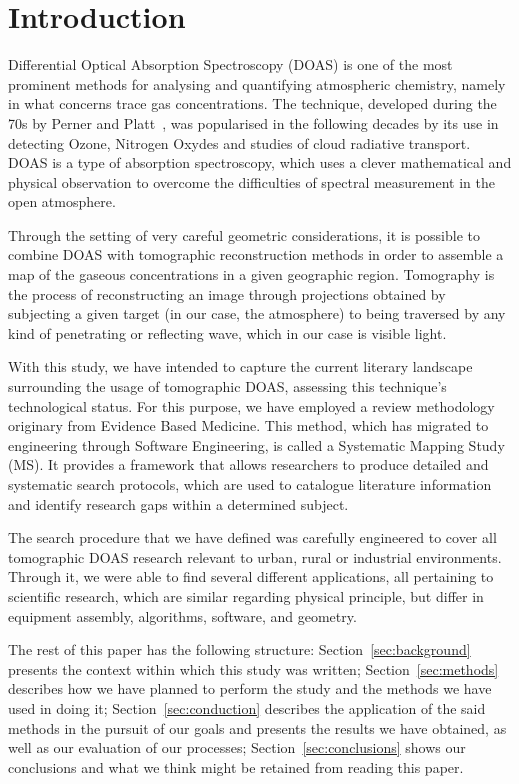 \section{Introduction}
\label{sec:introduction}

Differential Optical Absorption Spectroscopy (DOAS) is one of the most
prominent methods for analysing and quantifying atmospheric chemistry,
namely in what concerns trace gas concentrations. The technique,
developed during the 70s by Perner and Platt~\cite{Perner1976}, was
popularised in the following decades by its use in detecting Ozone,
Nitrogen Oxydes and studies of cloud radiative transport. DOAS is a type
of absorption spectroscopy, which uses a clever mathematical and
physical observation to overcome the difficulties of spectral
measurement in the open atmosphere.

Through the setting of very careful geometric considerations, it is
possible to combine DOAS with tomographic reconstruction methods in
order to assemble a map of the gaseous concentrations in a given
geographic region. Tomography is the process of reconstructing an image
through projections obtained by subjecting a given target (in our case,
the atmosphere) to being traversed by any kind of penetrating or
reflecting wave, which in our case is visible light.

With this study, we have intended to capture the current literary
landscape surrounding the usage of tomographic DOAS, assessing this
technique's technological status. For this purpose, we have employed a
review methodology originary from Evidence Based Medicine. This method,
which has migrated to engineering through Software Engineering, is
called a Systematic Mapping Study (MS). It provides a framework that
allows researchers to produce detailed and systematic search protocols,
which are used to catalogue literature information and identify research
gaps within a determined subject.

The search procedure that we have defined was carefully engineered to
cover all tomographic DOAS research relevant to urban, rural or
industrial environments. Through it, we were able to find several
different applications, all pertaining to scientific research, which are
similar regarding physical principle, but differ in equipment assembly,
algorithms, software, and geometry.

The rest of this paper has the following structure:
Section~\ref{sec:background} presents the context within which this
study was written; Section~\ref{sec:methods} describes how we have
planned to perform the study and the methods we have used in doing it;
Section~\ref{sec:conduction} describes the application of the said
methods in the pursuit of our goals and presents the results we have
obtained, as well as our evaluation of our processes;
Section~\ref{sec:conclusions} shows our conclusions and what we think
might be retained from reading this paper.
